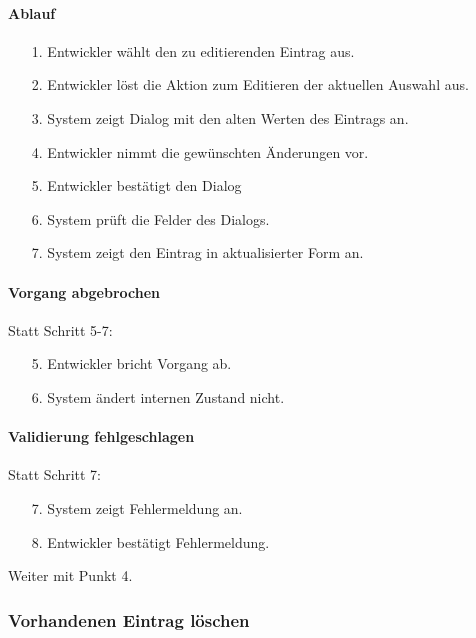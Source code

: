 \paragraph{Ablauf}

\begin{itemize}[itemsep=0pt]
\item[1.] Entwickler wählt den zu editierenden Eintrag aus.
\item[2.] Entwickler löst die Aktion zum Editieren der aktuellen Auswahl aus. 
\item[3.] System zeigt Dialog mit den alten Werten des Eintrags an.
\item[4.] Entwickler nimmt die gewünschten Änderungen vor.
\item[5.] Entwickler bestätigt den Dialog
\item[6.] System prüft die Felder des Dialogs.
\item[7.] System zeigt den Eintrag in aktualisierter Form an.
\end{itemize}

\paragraph{Vorgang abgebrochen}
Statt Schritt 5-7:
\begin{itemize}[itemsep=0pt]
\item[5.] Entwickler bricht Vorgang ab. 
\item[6.] System ändert internen Zustand nicht. 
\end{itemize}

\paragraph{Validierung fehlgeschlagen}
Statt Schritt 7:
\begin{itemize}[itemsep=0pt]
\item[7.] System zeigt Fehlermeldung an. 
\item[8.] Entwickler bestätigt Fehlermeldung. 
\end{itemize}
Weiter mit Punkt 4. 

\subsubsection{Vorhandenen Eintrag löschen}
\label{sec:delete_entry}


